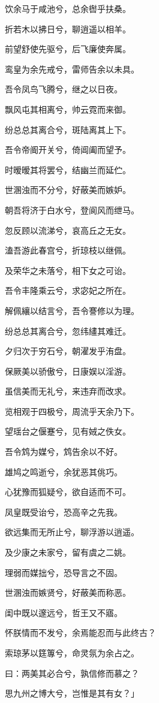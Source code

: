\documentclass[12pt,a4paper]{ctexbook}
\begin{document}
饮余马于咸池兮，总余辔乎扶桑。\par
折若木以拂日兮，聊逍遥以相羊。\par
前望舒使先驱兮，后飞廉使奔属。\par
鸾皇为余先戒兮，雷师告余以未具。\par
吾令凤鸟飞腾兮，继之以日夜。\par
飘风屯其相离兮，帅云霓而来御。\par
纷总总其离合兮，斑陆离其上下。\par
吾令帝阍开关兮，倚阊阖而望予。\par
时暧暧其将罢兮，结幽兰而延伫。\par
世溷浊而不分兮，好蔽美而嫉妒。\par
朝吾将济于白水兮，登阆风而绁马。\par
忽反顾以流涕兮，哀高丘之无女。\par
溘吾游此春宫兮，折琼枝以继佩。\par
及荣华之未落兮，相下女之可诒。\par
吾令丰隆乘云兮，求宓妃之所在。\par
解佩纕以结言兮，吾令謇修以为理。\par
纷总总其离合兮，忽纬繣其难迁。\par
夕归次于穷石兮，朝濯发乎洧盘。\par
保厥美以骄傲兮，日康娱以淫游。\par
虽信美而无礼兮，来违弃而改求。\par
览相观于四极兮，周流乎天余乃下。\par
望瑶台之偃蹇兮，见有娀之佚女。\par
吾令鸩为媒兮，鸩告余以不好。\par
雄鸠之鸣逝兮，余犹恶其佻巧。\par
心犹豫而狐疑兮，欲自适而不可。\par
凤皇既受诒兮，恐高辛之先我。\par
欲远集而无所止兮，聊浮游以逍遥。\par
及少康之未家兮，留有虞之二姚。\par
理弱而媒拙兮，恐导言之不固。\par
世溷浊而嫉贤兮，好蔽美而称恶。\par
闺中既以邃远兮，哲王又不寤。\par
怀朕情而不发兮，余焉能忍而与此终古？\par
索琼茅以筳篿兮，命灵氛为余占之。\par
曰：两美其必合兮，孰信修而慕之？\par
思九州之博大兮，岂惟是其有女？」\par
\end{document}
